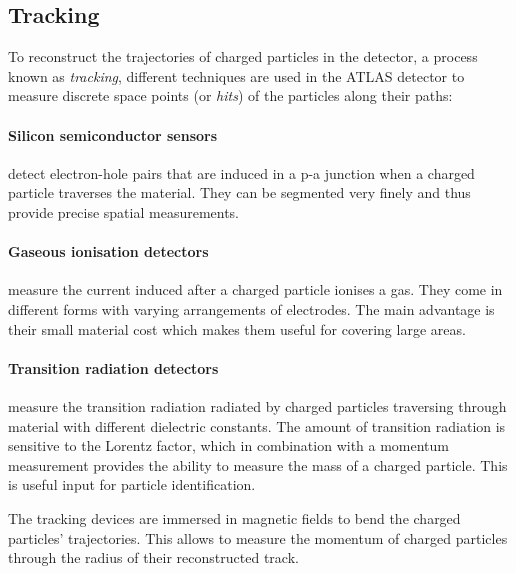 \subsection{Tracking}

To reconstruct the trajectories of charged particles in the detector, a process known as \emph{tracking}, different techniques are used in the ATLAS detector to measure discrete space points (or \emph{hits}) of the particles along their paths:
\paragraph{Silicon semiconductor sensors} detect electron-hole pairs that are induced in a p-a junction when a charged particle traverses the material. They can be segmented very finely and thus provide precise spatial measurements. 
\paragraph{Gaseous ionisation detectors} measure the current induced after a charged particle ionises a gas.  They come in different forms with varying arrangements of electrodes. The main advantage is their small material cost which makes them useful for covering large areas.
\paragraph{Transition radiation detectors} measure the transition radiation radiated by charged particles traversing through material with different dielectric constants. The amount of transition radiation is sensitive to the Lorentz factor, which in combination with a momentum measurement provides the ability to measure the mass of a charged particle. This is useful input for particle identification. 

The tracking devices are immersed in magnetic fields to bend the charged particles' trajectories. 
This allows to measure the momentum of charged particles through the radius of their reconstructed track.

